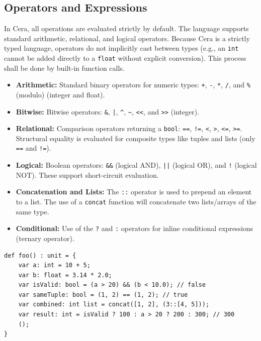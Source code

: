 \documentclass[11pt, a4paper]{article}
\begin{document}
\subsection{Operators and Expressions}
\noindent
In Cera, all operations are evaluated strictly by default. The language supports standard arithmetic, relational, and logical operators. Because Cera is a strictly typed language, operators do not implicitly cast between types (e.g., an \texttt{int} cannot be added directly to a \texttt{float} without explicit conversion). This process shall be done by built-in function calls.

\begin{itemize}
    \item \textbf{Arithmetic:} Standard binary operators for numeric types: \texttt{+}, \texttt{-}, \texttt{*}, \texttt{/}, and \texttt{\%} (modulo) (integer and float).
    \item \textbf{Bitwise:} Bitwise operators: \texttt{\&}, \texttt{|}, \texttt{\^{}}, \texttt{\~{}}, \texttt{<<}, and \texttt{>>} (integer).
    \item \textbf{Relational:} Comparison operators returning a \texttt{bool}: \texttt{==}, \texttt{!=}, \texttt{<}, \texttt{>}, \texttt{<=}, \texttt{>=}. Structural equality is evaluated for composite types like tuples and lists (only \texttt{==} and \texttt{!=}).
    \item \textbf{Logical:} Boolean operators: \texttt{\&\&} (logical AND), \texttt{||} (logical OR), and \texttt{!} (logical NOT). These support short-circuit evaluation.
    \item \textbf{Concatenation and Lists:} The \texttt{::} operator is used to prepend an element to a list. The use of a \texttt{concat} function will concatenate two lists/arrays of the same type.
    \item \textbf{Conditional:} Use of the \texttt{?} and \texttt{:} operators for inline conditional expressions (ternary operator).
\end{itemize}

\begin{lstlisting}[language=Cera, title={Expressions and Operators}, basicstyle=\ttfamily]
def foo() : unit = {
    var a: int = 10 + 5;
    var b: float = 3.14 * 2.0;
    var isValid: bool = (a > 20) && (b < 10.0); // false 
    var sameTuple: bool = (1, 2) == (1, 2); // true
    var combined: int list = concat([1, 2], (3::[4, 5]));
    var result: int = isValid ? 100 : a > 20 ? 200 : 300; // 300
    ();
}
\end{lstlisting}
\end{document}
